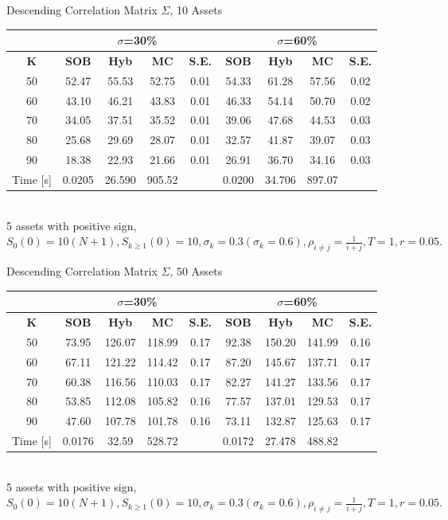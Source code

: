 \documentclass[a4paper]{article}
\begin{document}
\begin {table}
\caption {Descending Correlation Matrix $\Sigma$, 10 Assets} 
\begin{center}
\begin{tabular}{c|c c c c|c c c c}
\hline
\multicolumn{1}{c|}{} & \multicolumn{4}{|c|}{$\sigma$=30\%} & \multicolumn{4}{|c}{$\sigma$=60\%} \\ 
\hline
  \textbf{K} & \textbf{SOB} & \textbf{Hyb}	& \textbf{MC} & \textbf{S.E.} & \textbf{SOB} & \textbf{Hyb} & \textbf{MC} & \textbf{S.E.} \\
50 &	52.47	&	55.53	&	52.75	& 0.01	&	54.33	&	61.28	&	57.56 &	0.02 \\
60 & 	43.10	& 	46.21	& 	43.83 	& 0.01  &46.33 & 54.14 & 50.70& 0.02 \\
70 & 34.05 	& 37.51&35.52& 0.01& 39.06&47.68& 44.53 &0.03 \\
80 & 	25.68	&  29.69&28.07&0.01& 32.57& 41.87&39.07&0.03 \\
90 & 18.38 	& 22.93& 21.66 &0.01 & 26.91 &36.70 & 34.16 & 0.03 \\
\hline
Time [s] &0.0205 & 26.590 & 905.52 & &0.0200 &34.706& 897.07 & \\
\hline
\end{tabular}
\\[8pt]
\caption*{5 assets with positive sign, $S_0(0)=10(N+1), S_{k\geq1}(0) = 10, \sigma_k = 0.3 (\sigma_k = 0.6), \rho_{i\neq j} = \frac{1}{i+j}, T = 1, r=0.05.$}
\end{center}
\end{table}

\begin {table}
\caption {Descending Correlation Matrix $\Sigma$, 50 Assets} 
\begin{center}
\begin{tabular}{c|c c c  c|c c c c}
\hline
\multicolumn{1}{c|}{} & \multicolumn{4}{|c|}{$\sigma$=30\%} & \multicolumn{4}{|c}{$\sigma$=60\%} \\ 
\hline
  \textbf{K} & \textbf{SOB} & \textbf{Hyb}	& \textbf{MC}& \textbf{S.E.} & \textbf{SOB} & \textbf{Hyb} & \textbf{MC}& \textbf{S.E.} \\
50 &73.95&126.07&118.99&0.17& 92.38 &  150.20&141.99 &0.16  \\
60 &67.11&121.22&114.42&0.17& 87.20&  145.67&137.71 &0.17\\
70 &60.38&116.56&110.03&0.17& 82.27& 141.27 & 133.56 &0.17\\
80 &53.85&112.08&105.82& 0.16& 77.57& 137.01& 129.53 &0.17\\
90 &47.60&107.78&101.78& 0.16& 73.11&  132.87& 125.63 &0.17\\
\hline
Time [s] &0.0176 &32.59 &528.72 & &0.0172 &27.478&488.82 \\
\hline
\end{tabular}
\\[8pt]
\caption*{5 assets with positive sign, $S_0(0)=10(N+1), S_{k\geq1}(0) = 10, \sigma_k = 0.3 (\sigma_k = 0.6), \rho_{i\neq j} = \frac{1}{i+j}, T = 1, r=0.05.$}
\end{center}
\end{table}
\end{document}
